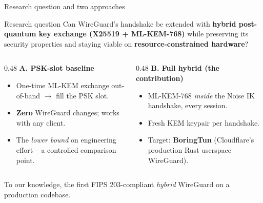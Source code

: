 \documentclass[aspectratio=169,11pt]{beamer}
\begin{document}
\begin{frame}{Research question and two approaches}
  \begin{block}{Research question}
    Can WireGuard's handshake be extended with \textbf{hybrid post-quantum key
    exchange (X25519 + ML-KEM-768)} while preserving its security properties and
    staying viable on \textbf{resource-constrained hardware}?
  \end{block}
  \vfill
  \begin{columns}[T]
    \begin{column}{0.48\textwidth}
      \textbf{A. PSK-slot baseline}
      \begin{itemize}\small
        \item One-time ML-KEM exchange out-of-band $\to$ fill the PSK slot.
        \item \textbf{Zero} WireGuard changes; works with any client.
        \item The \emph{lower bound} on engineering effort -- a controlled
              comparison point.
      \end{itemize}
    \end{column}
    \begin{column}{0.48\textwidth}
      \textbf{B. Full hybrid \hfill\small\color{pqprimary}(the contribution)}
      \begin{itemize}\small
        \item ML-KEM-768 \emph{inside} the Noise IK handshake, every session.
        \item Fresh KEM keypair per handshake.
        \item Target: \textbf{BoringTun} (Cloudflare's production Rust userspace
              WireGuard).
      \end{itemize}
    \end{column}
  \end{columns}
  \vfill
  \centering\small\color{pqgray} To our knowledge, the first FIPS 203-compliant
  \emph{hybrid} WireGuard on a production codebase.
\end{frame}
\end{document}
